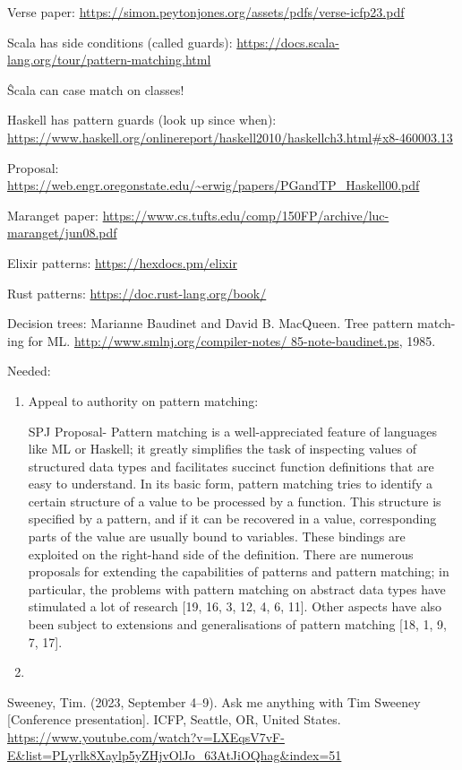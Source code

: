 \documentclass{article}
\begin{document}
Verse paper: 
\url{https://simon.peytonjones.org/assets/pdfs/verse-icfp23.pdf}

Scala has side conditions (called guards): 
\url{https://docs.scala-lang.org/tour/pattern-matching.html}

\^ Scala can case match on classes! 

Haskell has pattern guards (look up since when): 
    \url{https://www.haskell.org/onlinereport/haskell2010/haskellch3.html#x8-460003.13}


Proposal: 
\url{https://web.engr.oregonstate.edu/~erwig/papers/PGandTP_Haskell00.pdf}

Maranget paper: 
\url{https://www.cs.tufts.edu/comp/150FP/archive/luc-maranget/jun08.pdf}

Elixir patterns: 
\url{https://hexdocs.pm/elixir}

Rust patterns:
\url{https://doc.rust-lang.org/book/}

Decision trees: 
Marianne Baudinet and David B. MacQueen. Tree pattern match-
ing for ML. \url{http://www.smlnj.org/compiler-notes/
85-note-baudinet.ps}, 1985.

Needed: 
\begin{enumerate}
    \item Appeal to authority on pattern matching: 
    
    SPJ Proposal- Pattern matching is a well-appreciated feature of languages
    like ML or Haskell; it greatly simplifies the task of inspecting values of
    structured data types and facilitates succinct function definitions that are
    easy to understand. In its basic form, pattern matching tries to identify a
    certain structure of a value to be processed by a function. This structure
    is specified by a pattern, and if it can be recovered in a value,
    corresponding parts of the value are usually bound to variables. These
    bindings are exploited on the right-hand side of the definition. There are
    numerous proposals for extending the capabilities of patterns and pattern
    matching; in particular, the problems with pattern matching on abstract
    data types have stimulated a lot of research [19, 16, 3, 12, 4, 6, 11].
    Other aspects have also been subject to extensions and generalisations of
    pattern matching [18, 1, 9, 7, 17].
    \item 
\end{enumerate}


Sweeney, Tim. (2023, September 4–9). Ask me anything with Tim Sweeney
[Conference presentation]. ICFP, Seattle, OR, United States.
\url{https://www.youtube.com/watch?v=LXEqsV7vF-E&list=PLyrlk8Xaylp5yZHjvOlJo_63AtJiOQhag&index=51}
\end{document}
